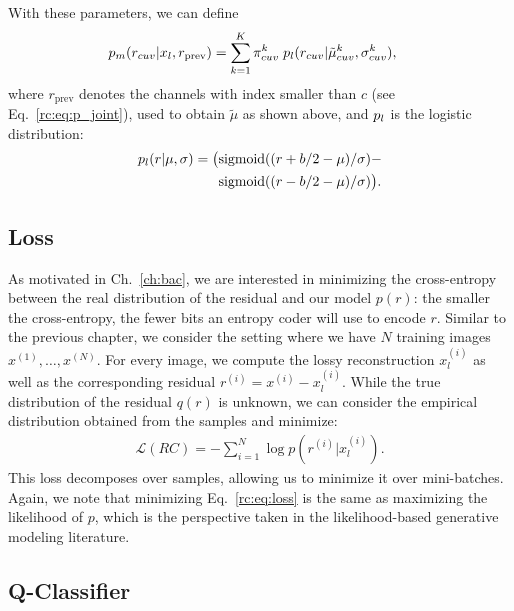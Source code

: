 With these parameters, we can define
\begin{align}
    p_m(r_{cuv} | x_l, r_{\text{prev}}) &= \sum_{k=1}^K \pi^k_{cuv} \; p_l(r_{cuv} | \tilde \mu^k_{cuv}, \sigma^k_{cuv}), 
    \label{rc:eq:p_mix}
\end{align}
where $r_\text{prev}$ denotes the channels with index smaller than $c$ (see Eq.~\ref{rc:eq:p_joint}), used to obtain $\tilde \mu$ as shown above, and $p_l$ is the logistic distribution:
\begin{align*}
    \plogistic(r | \mu, \sigma) = \bigl(%
        &\sigmoid((r + b/2 - \mu) / \sigma) -  \\%
        &\sigmoid((r - b/2 - \mu) / \sigma) \bigr). 
\end{align*}


\subsection{Loss}

As motivated in Ch.~\ref{ch:bac}, we are interested in minimizing the cross-entropy between the real distribution of the residual 
and our model $p(r)$: the smaller  the cross-entropy, the fewer bits an entropy coder will use to encode $r$.
Similar to the previous chapter, we consider the setting where we have $N$ training images $x^{(1)}, \dots, x^{(N)}$.
For every image, we compute the lossy reconstruction $x_l^{(i)}$ as well as the corresponding residual $r^{(i)} = x^{(i)} - x_l^{(i)}$.
While the true distribution of the residual $q(r)$ is unknown,
we can consider the empirical distribution obtained from the samples and minimize:
\begin{align}
\mathcal L(RC) =-\sum_{i=1}^N \log p(r^{(i)}|x_l^{(i)}). \label{rc:eq:loss}
\end{align}
This loss decomposes over samples, allowing us to minimize it over mini-batches.
Again, we note that minimizing Eq.~\ref{rc:eq:loss} is the same as maximizing the likelihood of $p$, which is the perspective taken in the likelihood-based generative modeling literature.

\subsection{Q-Classifier} \label{rc:sec:qclf}


